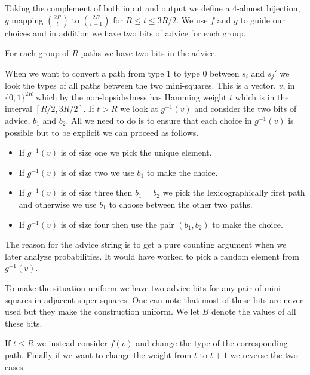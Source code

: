\documentclass{theoretics}
\begin{document}
Taking the complement of both input and output
we define a $4$-almost bijection, $g$ mapping
$2R \choose t$ to $2R \choose {t+1}$ for $R \leq t \leq 3R/2$.
We use $f$ and $g$ to guide our choices and
in addition we have
two bits of advice for each group.

\begin{definition} \label{def:advice}
For each group of $R$ paths we have two bits in the 
advice.
\end{definition}

When we want to convert a path from type $1$ to type
$0$ between $s_i$ and $s_j'$ we look the types of all paths between
the two mini-squares.  This is a vector, $v$, in $\{ 0,1\}^{2R}$
which by the non-lopsidedness has Hamming weight
$t$ which is in the interval $[R/2,3R/2]$.
If $t> R$ we look at $g^{-1}(v)$ and consider the
two bits of advice, $b_1$ and $b_2$.  All we
need to do is to ensure that each choice
in $g^{-1}(v)$ is possible but to be explicit we
can proceed as follows.

\begin{itemize}

\item If $g^{-1}(v)$
is of size one we pick the unique element.  

\item If $g^{-1}(v)$
is of size two we use $b_1$ to make the choice.

\item If $g^{-1}(v)$
is of size three then $b_1=b_2$ we pick
the lexicographically first path and
otherwise we use $b_1$ to choose between
the other two paths.

\item If $g^{-1}(v)$
is of size four then use the pair $(b_1,b_2)$ to
make the choice.

\end{itemize}
The reason for the advice string is to get a pure counting
argument when we later analyze probabilities. It would
have worked to pick a random element from
$g^{-1}(v)$.

To make the situation uniform we have two
advice bits for any pair of mini-squares in adjacent
super-squares.  One can note that most of these bits are never used
but they make the construction uniform.
We let $B$ denote the values of all these bits.

If $t \leq R$ we instead consider $f(v)$ and change the type
of the corresponding path.  Finally if we want
to change the weight from $t$ to $t+1$ we reverse the two 
cases.
\end{document}
